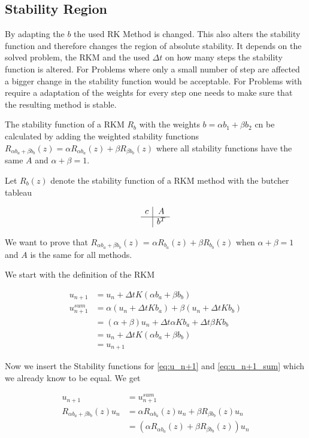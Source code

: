 \documentclass{article}
\begin{document}
\subsection{Stability Region}

By adapting the $b$ the used RK Method is changed. This also alters the stability function and therefore changes the region of absolute stability. 
It depends on the solved problem, the RKM and the used $\Delta t$ on how many steps the stability function is altered. For Problems where only a small number of step are affected a bigger change in the stability function would be acceptable. For Problems with require a adaptation of the weights for every step one needs to make sure that the resulting method is stable.


The stability function of a RKM  $R_b$  with the weights $b = \alpha b_1 + \beta b_2$ cn be calculated by adding the weighted stability functions $R_{\alpha b_a+\beta b_b}(z) = \alpha R_{\alpha b_a}(z) + \beta R_{\beta b_b}(z) $ where all stability functions have the same $A$ and $\alpha + \beta = 1$.

Let $R_b(z)$ denote the stability function of a RKM method with the butcher tableau

$$
\begin{array}
{c|c}
c & A\\
\hline
& b^T
\end{array}
$$

We want to prove that $R_{\alpha b_a+\beta b_b}(z)$ = $\alpha R_{ b_a}(z)+\beta R_{b_b}(z)$ when $\alpha + \beta = 1$ and $A$ is the same for all methods.

We start with the definition of the RKM

\begin{align}
u_{n+1} &= u_n + \Delta t K (\alpha b_a+\beta b_b) \label{eq:u_n+1}  \\
u_{n+1}^{sum} &= \alpha (u_n + \Delta t K b_a) + \beta (u_n + \Delta t K b_b) \label{eq:u_n+1_sum} \\
& = (\alpha + \beta) u_n + \Delta t \alpha K b_a + \Delta t \beta K b_b \\
&= u_n + \Delta t K (\alpha b_a+\beta b_b) \\
&=u_{n+1} 
\end{align}

Now we insert the Stability functions for \ref{eq:u_n+1} and \ref{eq:u_n+1_sum} which we already know to be equal. We get 

\begin{align}
u_{n+1} &= u_{n+1}^{sum} \\
R_{\alpha b_a+\beta b_b}(z) u_n &= \alpha R_{\alpha b_a}(z) u_n + \beta R_{\beta b_b}(z) u_n \\
&= (\alpha R_{\alpha b_a}(z) + \beta R_{\beta b_b}(z)) u_n
\end{align}
\end{document}
